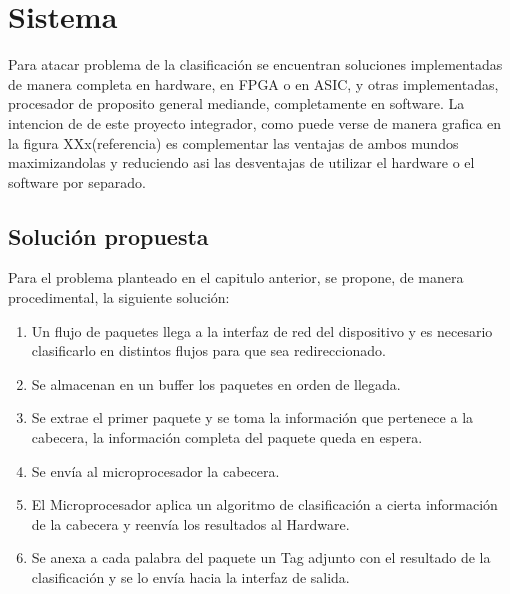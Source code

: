 \chapter{Sistema}

Para atacar problema de la clasificación se encuentran soluciones implementadas de manera completa en hardware, en FPGA o en ASIC, y otras implementadas, procesador de proposito general mediande, completamente en software. La intencion de de este proyecto integrador, como puede verse de manera grafica en la figura XXx(referencia) es complementar las ventajas de ambos mundos maximizandolas y reduciendo asi las desventajas de utilizar el hardware o el software por separado. 




\section{Solución propuesta}

Para el problema planteado en el capitulo anterior, se propone, de manera procedimental, la siguiente solución: 

    \begin{enumerate}
  	\item Un flujo de paquetes llega a la interfaz de red del dispositivo y es necesario clasificarlo en distintos flujos para que sea redireccionado.
	\item Se almacenan en un buffer los paquetes en orden de llegada.
	\item Se extrae el primer paquete y se toma la información que pertenece a la cabecera, la información completa del paquete queda en espera.
	\item Se envía al microprocesador la cabecera. 
	\item El Microprocesador aplica un algoritmo de clasificación a cierta información de la cabecera y reenvía los resultados al Hardware. 
	\item Se anexa a cada palabra del paquete un Tag adjunto con el resultado de la clasificación y se lo envía hacia la interfaz de salida.
    \end{enumerate}

